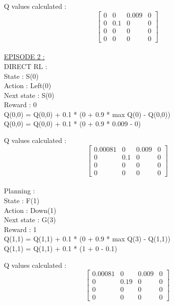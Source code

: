 \documentclass[12pt]{article}
\newenvironment{problem}[2][\large Problem]{\begin{trivlist}
\item[\hskip \labelsep {\bfseries #1}\hskip \labelsep {\bfseries #2.}]}{\end{trivlist}}
\begin{document}
\begin{problem} {4}
\begin{itemize}
Q values calculated : 
\[\begin{bmatrix}
0 & 0 & 0.009 & 0\\
0 & 0.1 & 0 & 0\\
0 & 0 & 0 & 0\\
0 & 0 & 0 & 0
\end{bmatrix}\]\\

\underline{EPISODE 2 :}\\

\hspace*{20pt} DIRECT RL : \\

State : S(0) \\ Action : Left(0) \\ Next state : S(0) \\ Reward : 0\\

\hspace*{20pt} Q(0,0) = Q(0,0) + 0.1 * (0 + 0.9 * max Q(0) - Q(0,0))\\
\hspace*{20pt} Q(0,0) = Q(0,0) + 0.1 * (0 + 0.9 * 0.009 - 0)

Q values calculated : 
\[\begin{bmatrix}
0.00081 & 0 & 0.009 & 0\\
0 & 0.1 & 0 & 0\\
0 & 0 & 0 & 0\\
0 & 0 & 0 & 0
\end{bmatrix}\]\\

\hspace*{20pt} Planning : \\


State : F(1) \\ Action : Down(1) \\ Next state : G(3) \\ Reward : 1\\
\hspace*{20pt} Q(1,1) = Q(1,1) + 0.1 * (0 + 0.9 * max Q(3) - Q(1,1))\\
\hspace*{20pt} Q(1,1) = Q(1,1) + 0.1 * (1 + 0 - 0.1)

Q values calculated : 
\[\begin{bmatrix}
0.00081 & 0 & 0.009 & 0\\
0 & 0.19 & 0 & 0\\
0 & 0 & 0 & 0\\
0 & 0 & 0 & 0
\end{bmatrix}\]\\


\end{itemize}
\end{problem}
\end{document}

